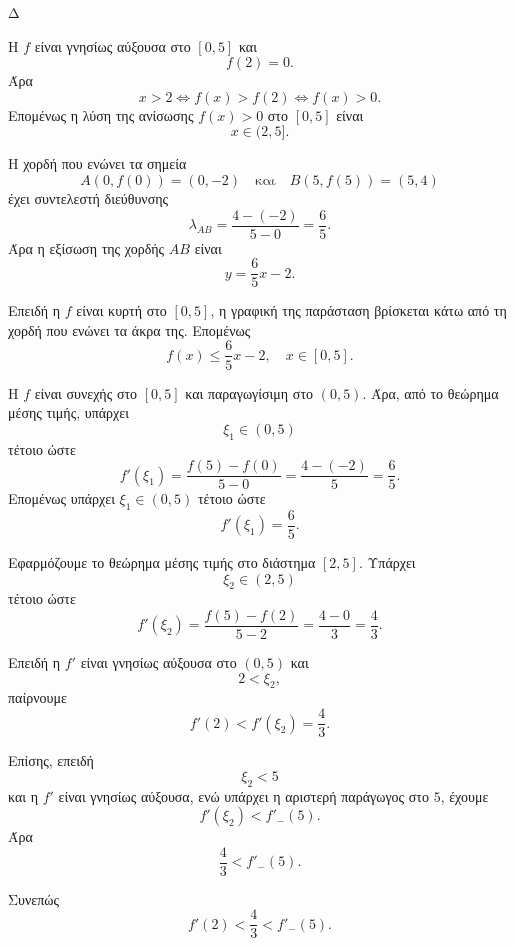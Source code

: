 \begin{thema}{Δ}
\begin{erwthma}
\item Η $f$ είναι γνησίως αύξουσα στο $[0,5]$ και
\[
f(2)=0.
\]
Άρα
\[
x>2
\Leftrightarrow
f(x)>f(2)
\Leftrightarrow
f(x)>0.
\]
Επομένως η λύση της ανίσωσης $f(x)>0$ στο $[0,5]$ είναι
\[
{x\in(2,5]}.
\]

\item Η χορδή που ενώνει τα σημεία
\[
A(0,f(0))=(0,-2)
\quad\text{και}\quad
B(5,f(5))=(5,4)
\]
έχει συντελεστή διεύθυνσης
\[
\lambda_{AB}=\frac{4-(-2)}{5-0}=\frac65.
\]
Άρα η εξίσωση της χορδής $AB$ είναι
\[
y=\frac65x-2.
\]

Επειδή η $f$ είναι κυρτή στο $[0,5]$, η γραφική της παράσταση βρίσκεται
κάτω από τη χορδή που ενώνει τα άκρα της. Επομένως
\[
{f(x)\leq \frac65x-2,\quad x\in[0,5]}.
\]

\item Η $f$ είναι συνεχής στο $[0,5]$ και παραγωγίσιμη στο $(0,5)$.
Άρα, από το θεώρημα μέσης τιμής, υπάρχει
\[
\xi_1\in(0,5)
\]
τέτοιο ώστε
\[
f'(\xi_1)=\frac{f(5)-f(0)}{5-0}
=\frac{4-(-2)}{5}
=\frac65.
\]
Επομένως υπάρχει $\xi_1\in(0,5)$ τέτοιο ώστε
\[
{f'(\xi_1)=\frac65}.
\]

\item Εφαρμόζουμε το θεώρημα μέσης τιμής στο διάστημα $[2,5]$.
Υπάρχει
\[
\xi_2\in(2,5)
\]
τέτοιο ώστε
\[
f'(\xi_2)=\frac{f(5)-f(2)}{5-2}
=\frac{4-0}{3}
=\frac43.
\]

Επειδή η $f'$ είναι γνησίως αύξουσα στο $(0,5)$ και
\[
2<\xi_2,
\]
παίρνουμε
\[
f'(2)<f'(\xi_2)=\frac43.
\]

Επίσης, επειδή
\[
\xi_2<5
\]
και η $f'$ είναι γνησίως αύξουσα, ενώ υπάρχει η αριστερή παράγωγος στο
$5$, έχουμε
\[
f'(\xi_2)<f'_{-}(5).
\]
Άρα
\[
\frac43<f'_{-}(5).
\]

Συνεπώς
\[
{f'(2)<\frac43<f'_{-}(5)}.
\]
\end{erwthma}
\end{thema}


